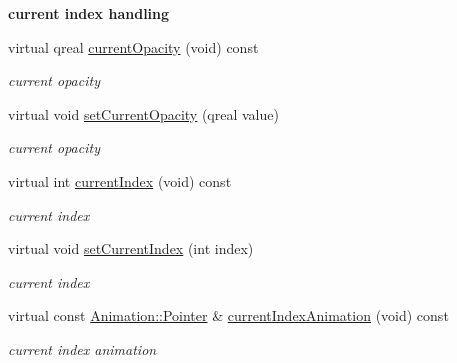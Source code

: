 \begin{Indent}\textbf{ current index handling}\par
\begin{DoxyCompactItemize}
\item 
\mbox{\label{class_header_view_data_a642674c8fd51f61d889fa3099140f9ab}} 
virtual qreal \hyperlink{class_header_view_data_a642674c8fd51f61d889fa3099140f9ab}{current\+Opacity} (void) const
\begin{DoxyCompactList}\small\item\em current opacity \end{DoxyCompactList}\item 
\mbox{\label{class_header_view_data_a3c866fe7957d235401a57167bd18c956}} 
virtual void \hyperlink{class_header_view_data_a3c866fe7957d235401a57167bd18c956}{set\+Current\+Opacity} (qreal value)
\begin{DoxyCompactList}\small\item\em current opacity \end{DoxyCompactList}\item 
\mbox{\label{class_header_view_data_aa72e0bb36683b65dca8d313835d36c9d}} 
virtual int \hyperlink{class_header_view_data_aa72e0bb36683b65dca8d313835d36c9d}{current\+Index} (void) const
\begin{DoxyCompactList}\small\item\em current index \end{DoxyCompactList}\item 
\mbox{\label{class_header_view_data_a431c660ec5bd5471bb9cebaf71762a7c}} 
virtual void \hyperlink{class_header_view_data_a431c660ec5bd5471bb9cebaf71762a7c}{set\+Current\+Index} (int index)
\begin{DoxyCompactList}\small\item\em current index \end{DoxyCompactList}\item 
\mbox{\label{class_header_view_data_a157fabba8ed43ec0acc2f61420107c0b}} 
virtual const \hyperlink{class_animation_ac48a8d074abd43dc3f6485353ba24e30}{Animation\+::\+Pointer} \& \hyperlink{class_header_view_data_a157fabba8ed43ec0acc2f61420107c0b}{current\+Index\+Animation} (void) const
\begin{DoxyCompactList}\small\item\em current index animation \end{DoxyCompactList}\end{DoxyCompactItemize}
\end{Indent}
